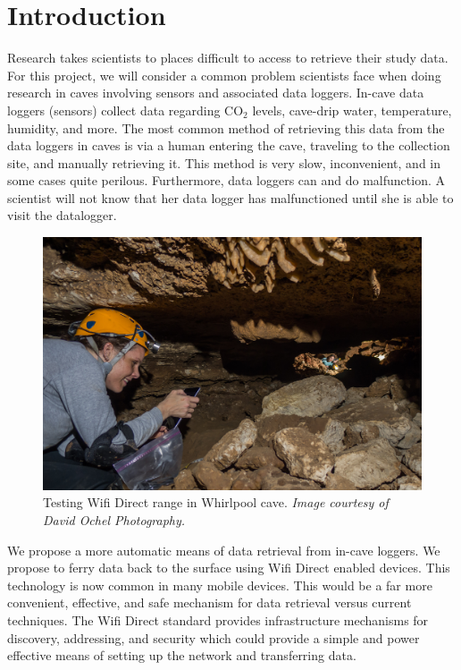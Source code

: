 \documentclass[10pt,twocolumn]{article}
\begin{document}
\section{Introduction}
Research takes scientists to places difficult to access to retrieve their study data. 
For this project, we will consider a common problem scientists face when doing research in caves involving sensors and associated data loggers. 
In-cave data loggers (sensors) collect data regarding CO$_2$ levels, cave-drip water, temperature, humidity, and more. 
The most common method of retrieving this data from the data loggers in caves is via a human entering the cave, traveling to the collection site, and manually retrieving it. 
This method is very slow, inconvenient, and in some cases quite perilous. 
Furthermore, data loggers can and do malfunction.
A scientist will not know that her data logger has malfunctioned until she is able to visit the datalogger.
\begin{figure}[t]
\includegraphics[width=\textwidth]{cavewifi2}
\caption{Testing Wifi Direct range in Whirlpool cave. \textit{Image courtesy of David Ochel Photography.}}
\end{figure}
We propose a more automatic means of data retrieval from in-cave loggers. 
We propose to ferry data back to the surface using Wifi Direct enabled devices. 
This technology is now common in many mobile devices.
This would be a far more convenient, effective, and safe mechanism for data retrieval versus current techniques.  
The Wifi Direct standard provides infrastructure mechanisms for discovery, addressing, and security which could provide a simple and power effective means of setting up the network and transferring data. 
\end{document}
